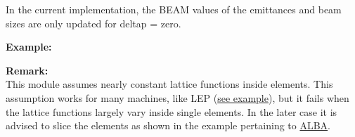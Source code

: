 In the current implementation, the BEAM values of the emittances and
beam sizes are only updated for deltap = zero.  

{\bf Example:}\\ 

{\bf Remark:}\\
 This module assumes nearly constant lattice functions
inside elements. This assumption works for many machines, like LEP
(\href{http://cern.ch/frs/mad-X_examples/emit/LEP/}{see example}), but
it fails when the lattice functions largely vary inside single
elements. In the later case it is advised to slice the elements as shown
in the example pertaining to
\href{http://cern.ch/frs/mad-X_examples/emit/ALBA/}{ALBA}.     


